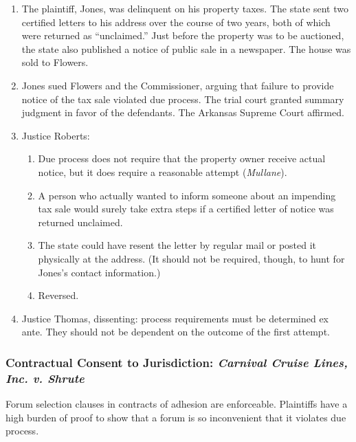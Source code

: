\begin{enumerate}
    \item The plaintiff, Jones, was delinquent on his property taxes. The 
    state sent two certified letters to his address over the course of two 
    years, both of which were returned as ``unclaimed.'' Just before the 
    property was to be auctioned, the state also published a notice of public 
    sale in a newspaper. The house was sold to Flowers.
    \item Jones sued Flowers and the Commissioner, arguing that failure to 
    provide notice of the tax sale violated due process. The trial court 
    granted summary judgment in favor of the defendants. The Arkansas Supreme 
    Court affirmed.
    \item Justice Roberts:
    \begin{enumerate}
        \item Due process does not require that the property owner receive 
        actual notice, but it does require a reasonable attempt 
        (\emph{Mullane}).
        \item A person who actually wanted to inform someone about an 
        impending tax sale would surely take extra steps if a certified letter 
        of notice was returned unclaimed.
        \item The state could have resent the letter by regular mail or posted 
        it physically at the address. (It should not be required, though, to 
        hunt for Jones's contact information.)
        \item Reversed.
    \end{enumerate}
    \item Justice Thomas, dissenting: process requirements must be determined 
    ex ante. They should not be dependent on the outcome of the first attempt.
\end{enumerate}

\subsubsection{Contractual Consent to Jurisdiction: \emph{Carnival Cruise 
Lines, Inc. v. Shrute}}

Forum selection clauses in contracts of adhesion are enforceable. Plaintiffs 
have a high burden of proof to show that a forum is so inconvenient that it 
violates due process.

